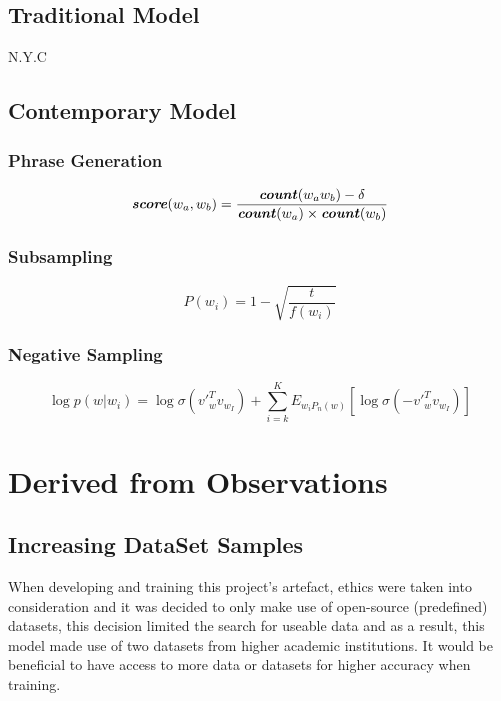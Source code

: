 \subsection{Traditional Model}

N.Y.C

\subsection{Contemporary Model}

\subsubsection{Phrase Generation}

\begin{equation}
    \textbf{\textit{score}}(w_{a}, w_{b}) = \frac{\textbf{\textit{count}}(w_{a}w_{b}) - \delta}{\textbf{\textit{count}}(w_{a}) \times \textbf{\textit{count}}(w_{b})}
\end{equation}

\subsubsection{Subsampling}

\begin{equation}
    P(w_{i}) = 1 - \sqrt{\frac{t}{f(w_{i})}}
\end{equation}

\subsubsection{Negative Sampling}

\begin{equation}
    \log p(w | w_{i}) = \log \sigma ({v'}_{w}^{T} v_{w_{I}}) + \sum_{i=k}^{K} E_{w_{i}P_{n}(w)} \left [ \log \sigma (-{v'}_{w}^{T} v_{w_{I}}) \right ]
\end{equation}

\newpage

\section{Derived from Observations}

\subsection{Increasing DataSet Samples}
When developing and training this project’s artefact, ethics were taken into consideration and it was decided to only make use of open-source (predefined) datasets, this decision limited the search for useable data and as a result, this model made use of two datasets from higher academic institutions. It would be beneficial to have access to more data or datasets for higher accuracy when training.

